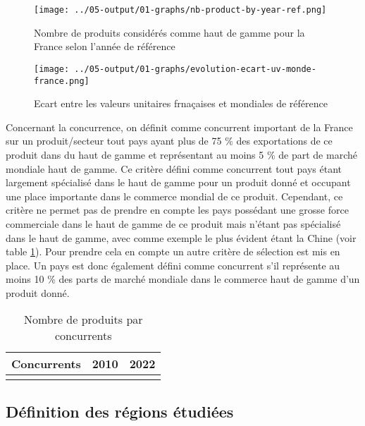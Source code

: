 \documentclass[french,10pt,a4paper]{article}
\begin{document}
\begin{figure}[!h]
  \centering
  \texttt{[image: ../05-output/01-graphs/nb-product-by-year-ref.png]}
  \caption{Nombre de produits considérés comme haut de gamme pour la France selon l'année de référence}
  \label{fig:nb-products-by-year-ref}
\end{figure}

\begin{figure}[!h]
  \centering
  \texttt{[image: ../05-output/01-graphs/evolution-ecart-uv-monde-france.png]}
  \caption{Ecart entre les valeurs unitaires frnaçaises et mondiales de référence}

\end{figure}

Concernant la concurrence, on définit comme concurrent important de la France sur un produit/secteur tout pays ayant plus de 75 \% des exportations de ce produit dans du haut de gamme et représentant au moins 5 \% de part de marché mondiale haut de gamme. Ce critère défini comme concurrent tout pays étant largement spécialisé dans le haut de gamme pour un produit donné et occupant une place importante dans le commerce mondial de ce produit. Cependant, ce critère ne permet pas de prendre en compte les pays possédant une grosse force commerciale dans le haut de gamme de ce produit mais n'étant pas spécialisé dans le haut de gamme, avec comme exemple le plus évident étant la Chine (voir table \ref{tab:nb-product-by-concu}). Pour prendre cela en compte un autre critère de sélection est mis en place. Un pays est donc également défini comme concurrent s'il représente au moins 10 \% des parts de marché mondiale dans le commerce haut de gamme d'un produit donné.

\begin{table}[ht]
  \centering
  \begin{tabular}{lrr}
    \hline
   Concurrents & 2010 & 2022 \\
    \hline
    \\
    \hline
  \end{tabular}
  \caption{Nombre de produits par concurrents}
  \label{tab:nb-product-by-concu}
\end{table}

\subsection{Définition des régions étudiées}
\end{document}

